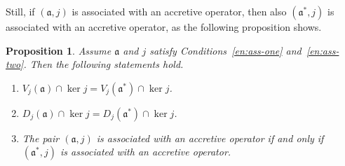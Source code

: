 \documentclass[a4paper,oneside,12pt]{amsart}
\theoremstyle{plain}
\newtheorem{proposition}[theorem]{Proposition}
\theoremstyle{definition}
\begin{document}
Still, if $({{\mathfrak{{a}}}},j)$ is associated with an accretive operator, then also $({{\mathfrak{{a}}}}^*,j)$ is associated with an accretive operator,
as the following proposition shows.
\begin{proposition}\label{prop:as}
Assume ${{\mathfrak{{a}}}}$ and $j$ satisfy Conditions~\ref{en:ass-one} and~\ref{en:ass-two}. Then the following statements hold.
\begin{enumerate}[\upshape (a)]
\item\label{en:Vas} $V_j({{\mathfrak{{a}}}})\cap\ker j = V_j({{\mathfrak{{a}}}}^*)\cap\ker j$.
\item\label{en:DHas} $D_j({{\mathfrak{{a}}}})\cap\ker j = D_j({{\mathfrak{{a}}}}^*) \cap\ker j$.
\item\label{en:as-welldef} The pair $({{\mathfrak{{a}}}},j)$ is associated with an accretive operator if and only if $({{\mathfrak{{a}}}}^*,j)$ is 
associated with an accretive operator.
\end{enumerate}
\end{proposition}
\end{document}
